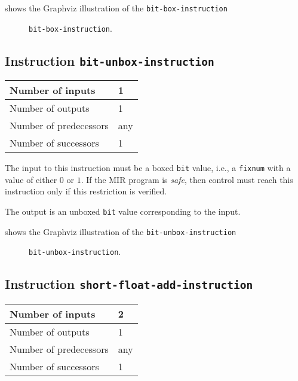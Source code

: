  shows the Graphviz illustration of the
\texttt{bit-box-instruction}

\begin{figure}
\begin{center}
\end{center}
\caption{\label{fig-bit-box-instruction}
\texttt{bit-box-instruction}.}
\end{figure}

\subsection{Instruction \texttt{bit-unbox-instruction}}
\label{mir-instruction-bit-unbox}

\begin{tabular}{|l|l|}
\hline
Number of inputs & 1\\
\hline
Number of outputs & 1\\
\hline
Number of predecessors & any\\
\hline
Number of successors & 1\\
\hline
\end{tabular}

The input to this instruction must be a boxed \texttt{bit} value,
i.e., a \texttt{fixnum} with a value of either $0$ or $1$.  If the MIR
program is \emph{safe}, then control must reach this instruction only
if this restriction is verified.

The output is an unboxed \texttt{bit} value corresponding to
the input.

 shows the Graphviz illustration of the
\texttt{bit-unbox-instruction}

\begin{figure}
\begin{center}
\end{center}
\caption{\label{fig-bit-unbox-instruction}
\texttt{bit-unbox-instruction}.}
\end{figure}

\subsection{Instruction \texttt{short-float-add-instruction}}
\label{mir-instruction-short-float-add}

\begin{tabular}{|l|l|}
\hline
Number of inputs & 2\\
\hline
Number of outputs & 1\\
\hline
Number of predecessors & any\\
\hline
Number of successors & 1\\
\hline
\end{tabular}

